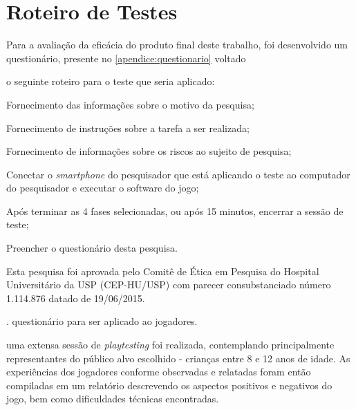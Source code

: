 
\chapter{Roteiro de Testes}\label{cap-roteiro-testes}

Para a avaliação da eficácia do produto final deste trabalho, foi
desenvolvido um questionário, presente no \autoref{apendice:questionario} voltado 


o seguinte roteiro para o teste que seria aplicado:

\begin{alineas}
	\item Fornecimento das informações sobre o motivo da pesquisa;
	\item Fornecimento de instruções sobre a tarefa a ser realizada;
	\item Fornecimento de informações sobre os riscos ao sujeito de pesquisa;
	\item Conectar o \textit{smartphone} do pesquisador que está aplicando o teste ao computador do pesquisador e executar o software do jogo; 
	\item Após terminar as 4 fases selecionadas, ou após 15 minutos, encerrar a sessão de teste;
	\item Preencher o questionário desta pesquisa.
\end{alineas}


Esta pesquisa foi aprovada pelo Comitê de Ética em Pesquisa do Hospital Universitário da USP (CEP-HU/USP) com parecer consubstanciado número 1.114.876 datado de 19/06/2015.

. questionário para ser aplicado ao jogadores.


uma extensa 
sessão de \textit{playtesting} foi realizada, contemplando principalmente
representantes do público alvo escolhido - crianças entre 8 e 12 anos de 
idade. As experiências dos jogadores conforme observadas e relatadas foram 
então compiladas em um relatório descrevendo os aspectos positivos e negativos 
do jogo, bem como dificuldades técnicas encontradas.


